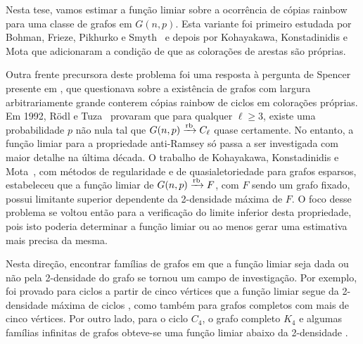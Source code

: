 \documentclass[12pt,a4paper]{book}
\def\rbarrow{\xrightarrow[]{\raisebox{0.0mm}[0mm]{$\scriptstyle \rm rb$}}}
\begin{document}
Nesta tese, vamos estimar a função limiar sobre a ocorrência de cópias rainbow para uma classe de grafos em $G(n,p)$. 
Esta variante foi primeiro estudada por Bohman, Frieze, Pikhurko e Smyth~\cite{bohman10:_aR_rgs} e depois por  Kohayakawa, Konstadinidis e Mota \cite{KoKoMo12} que adicionaram a condição de que as colorações de arestas são próprias.

 Outra frente precursora deste problema foi uma resposta à pergunta de Spencer presente em \cite{erdos79:_some}, que questionava sobre a existência de grafos com largura arbitrariamente grande conterem cópias rainbow de ciclos em colorações próprias. 
 Em 1992, Rödl e Tuza~\cite{roedl92:_rainb}
 provaram que para qualquer $\ell \geq 3$, existe uma probabilidade $p$ não nula tal que $G(n,p)\rbarrow C_\ell$ quase certamente.
 No entanto, a função limiar para a propriedade anti-Ramsey só passa a ser investigada com maior detalhe na última década.
 O trabalho de Kohayakawa, Konstadinidis e Mota~\cite{KoKoMo12}, com métodos de regularidade \cite{Kohayakawa97Szemeredi, KoRo03}  e de quasialetoriedade \cite{ChGr08} para grafos esparsos, estabeleceu que a  função limiar de $G(n,p)\rbarrow F$, com $F$ sendo um grafo fixado, possui limitante superior dependente da 2-densidade máxima de $F$.
 O foco desse problema se voltou então para a verificação do limite inferior desta propriedade, pois isto poderia determinar a função limiar ou ao menos gerar uma estimativa mais precisa da mesma.

Nesta direção, encontrar famílias de grafos em que a função limiar seja dada ou não pela 2-densidade do grafo se tornou um campo de investigação. 
Por exemplo, foi provado para ciclos a partir de cinco vértices que a função limiar segue da 2-densidade máxima de ciclos \cite{barros2021anti, NePeSkSt14}, 
como também para grafos completos \cite{kohayakawa2019anti, NePeSkSt14} com mais de cinco vértices.
Por outro lado, para o ciclo $C_4$, o grafo completo $K_4$ e algumas famílias infinitas de grafos obteve-se uma função limiar abaixo da 2-densidade \cite{mota2017advances, kohayakawa2019anti, KoKoMo16+, araujo2022anti}.
\end{document}
